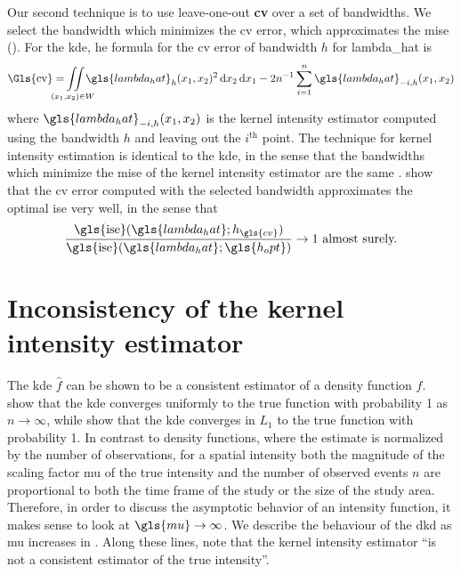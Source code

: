 Our second technique is to use leave-one-out \textbf{\gls{cv}} over a set of bandwidths.
We select the bandwidth which minimizes the \gls{cv} error,
which approximates the \gls{mise} ().
For the \gls{kde},
he formula for the \gls{cv} error of bandwidth $h$ for \gls{lambda_hat} is
\begin{equation}
    \label{eq:cverror}
    \mbox{\Gls{cv}}%
        = \iintW{\gls{lambda_hat}_h \xvec^2}
        - 2 n^{-1} \sum\limits_{i=1}^n \gls{lambda_hat}_{-i,h}\xvec%
\end{equation}
where $\gls{lambda_hat}_{-i,h}\xvec$ is the \gls{kernel intensity estimator} computed using the bandwidth $h$ and leaving out the $i^\text{th}$ point.
The technique for \gls{kernel intensity estimation} is identical to the \gls{kde},
in the sense that the bandwidths which minimize the \gls{mise} of the \gls{kernel intensity estimator} are the same \citep{brooks1991asymptotic}. 
 show that the \gls{cv} error computed with the selected bandwidth approximates the optimal \gls{ise} very well,
in the sense that
\begin{equation}
    \frac   {\mbox{\gls{ise}}(\gls{lambda_hat}; h_{\gls{cv}})}%
            {\mbox{\gls{ise}}(\gls{lambda_hat}; \gls{h_opt})}%
            \to 1 ~\text{almost surely.}%
\end{equation}

\section{Inconsistency of the kernel intensity estimator}
\label{sec:theory:inconsistency}

The \gls{kde} $\hat{f}$ can be shown to be a consistent estimator of a density function $f$.
\citet{bertrand1978convergence} show that the \gls{kde} converges uniformly to the true function with probability 1 as $n \to \infty$,
while \citet{devroye1985nonparametric} show that the \gls{kde} converges in $L_1$ to the true function with probability 1.
In contrast to density functions,
where the estimate is normalized by the number of observations,
for a spatial intensity
both the magnitude of the scaling factor \gls{mu} of the true intensity
and the number of observed events $n$ are proportional
to both the time frame of the study or the size of the study area.
Therefore,
in order to discuss the asymptotic behavior of an intensity function,
it makes sense to look at $\gls{mu} \to \infty$.
We describe the behaviour of the \gls{dkd} as \gls{mu} increases in .
Along these lines,
\citet{guan2008consistent} note that the \gls{kernel intensity estimator}
``is not a consistent estimator of the true intensity''.

